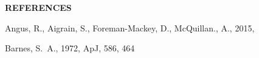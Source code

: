 \documentclass[letterpaper,11pt,preprint]{hack_aastex}
\begin{document}

\begin{multicols}{2}
{\centering\bf REFERENCES\par}
\vspace{0.2em}
\begin{thebibliography}{}%
\raggedright\raggedbottom\scriptsize\setlength{\parskip}{-0.5em}%

Angus, R., Aigrain, S., Foreman-Mackey, D., McQuillan., A., 2015,


Barnes, S.~A., 1972, ApJ, 586, 464



\end{thebibliography}
\end{multicols}
\end{document}
